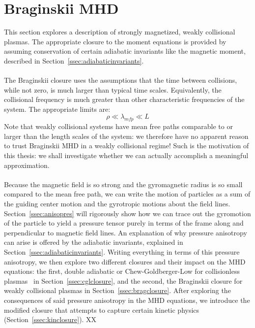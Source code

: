 

\section{Braginskii MHD} \label{sec:bragMHD}
This section explores a description of strongly magnetized, weakly collisional plasmas. The appropriate closure to the moment equations is provided by assuming conservation of certain adiabatic invariants like the magnetic moment, described in Section~\ref{ssec:adiabaticinvariants}. \\
\\
The Braginskii closure uses the assumptions that the time between collisions, while not zero, is much larger than typical time scales. Equivalently, the collisional frequency is much greater than other characteristic frequencies of the system. The appropriate limits are:
\begin{equation}
  \rho\ll\lambda_{mfp}\ll L \label{eq:bragord}
\end{equation}
Note that weakly collisional systems have mean free paths comparable to or larger than the length scales of the system: we therefore have no apparent reason to trust Braginskii MHD in a weakly collisional regime! Such is the motivation of this thesis: we shall investigate whether we can actually accomplish a meaningful approximation.\\
\\
Because the magnetic field is so strong and the gyromagnetic radius is so small compared to the mean free path, we can write the motion of particles as a sum of the guiding center motion and the gyrotropic motions about the field lines. Section~\ref{ssec:anisopres} will rigorously show how we can trace out the gyromotion of the particle to yield a pressure tensor purely in terms of the frame along and perpendicular to magnetic field lines. An explanation of why pressure anisotropy can arise is offered by the adiabatic invariants, explained in Section~\ref{ssec:adiabaticinvariants}. Writing everything in terms of this pressure anisotropy, we then explore two different closures and their impact on the MHD equations: the first, double adiabatic or Chew-Goldberger-Low for collisionless plasmas~\cite{CGL1956} in Section~\ref{ssec:cglclosure}, and the second, the Braginskii closure for weakly collisional plasmas in Section~\ref{ssec:bragclosure}. After exploring the consequences of said pressure anisotropy in the MHD equations, we introduce the modified closure that attempts to capture certain kinetic physics (Section~\ref{ssec:kinclosure}).
XX


